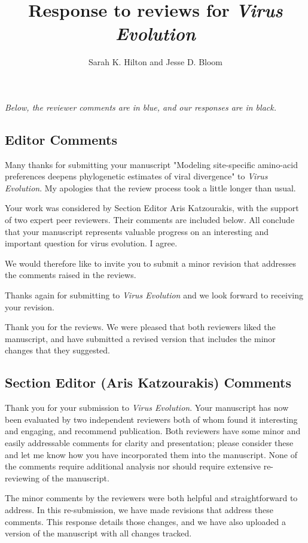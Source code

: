 \documentclass[11pt, oneside]{article}   	%
\title{Response to reviews for \textit{Virus Evolution}}
\author{Sarah K. Hilton and Jesse D. Bloom}
\newcommand{\response}[1]{{\color{black}#1}}
\begin{document}
\maketitle

\emph{Below, the reviewer comments {\color{blue} are in blue}, and our responses are in black.}

\color{blue}

\subsection*{Editor Comments}
Many thanks for submitting your manuscript "Modeling site-specific amino-acid preferences deepens phylogenetic estimates of viral divergence" to \textit{Virus Evolution}. My apologies that the review process took a little longer than usual.

Your work was considered by Section Editor Aris Katzourakis, with the support of two expert peer reviewers. Their comments are included below. All conclude that your manuscript represents valuable progress on an interesting and important question for virus evolution. I agree.

We would therefore like to invite you to submit a minor revision that addresses the comments raised in the reviews.

Thanks again for submitting to \textit{Virus Evolution} and we look forward to receiving your revision.

\response{Thank you for the reviews.
We were pleased that both reviewers liked the manuscript, and have submitted a revised version that includes the minor changes that they suggested.}

\subsection*{Section Editor (Aris Katzourakis) Comments}

Thank you for your submission to \textit{Virus Evolution}. Your manuscript has now been evaluated by two independent reviewers both of whom found it interesting and engaging, and recommend publication. Both reviewers have some minor and easily addressable comments for clarity and presentation; please consider these and let me know how you have incorporated them into the manuscript. None of the comments require additional analysis nor should require extensive re-reviewing of the manuscript.

\response{The minor comments by the reviewers were both helpful and straightforward to address.
In this re-submission, we have made revisions that address these comments.
This response details those changes, and we have also uploaded a version of the manuscript with all changes tracked.}
\end{document}
